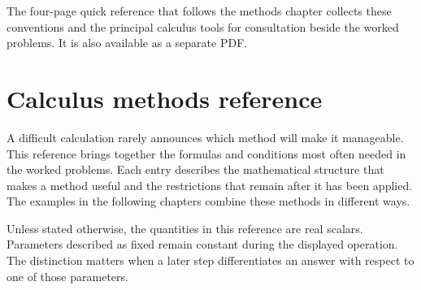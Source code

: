 \documentclass[11pt,oneside,openany]{book}
\begin{document}
The four-page quick reference that follows the methods chapter
collects these conventions and the principal calculus tools for consultation
beside the worked problems. It is also available as a separate PDF.

\chapter{Calculus methods reference}

A difficult calculation rarely announces which method will make it manageable.
This reference brings together the formulas and conditions most often needed in
the worked problems. Each entry describes the mathematical structure that makes
a method useful and the restrictions that remain after it has been applied.
The examples in the following chapters combine these methods in different ways.

Unless stated otherwise, the quantities in this reference are real scalars.
Parameters described as fixed remain constant during the displayed operation.
The distinction matters when a later step differentiates an answer with respect
to one of those parameters.
\end{document}

